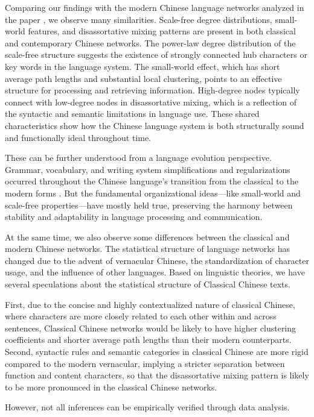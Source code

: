 \documentclass[11pt]{article}
\begin{document}
Comparing our findings with the modern Chinese language networks analyzed in the paper \cite{ZHOU20083039}, we observe many similarities.  Scale-free degree distributions, small-world features, and disassortative mixing patterns are present in both classical and contemporary Chinese networks. The power-law degree distribution of the scale-free structure suggests the existence of strongly connected hub characters or key words in the language system. The small-world effect, which has short average path lengths and substantial local clustering, points to an effective structure for processing and retrieving information. High-degree nodes typically connect with low-degree nodes in disassortative mixing, which is a reflection of the syntactic and semantic limitations in language use. These shared characteristics show how the Chinese language system is both structurally sound and functionally ideal throughout time.

These can be further understood from a language evolution perspective. Grammar, vocabulary, and writing system simplifications and regularizations occurred throughout the Chinese language's transition from the classical to the modern forms \cite{chen1999modern}. But the fundamental organizational ideas—like small-world and scale-free properties—have mostly held true, preserving the harmony between stability and adaptability in language processing and communication.

At the same time, we also observe some differences between the classical and modern Chinese networks. The statistical structure of language networks has changed due to the advent of vernacular Chinese, the standardization of character usage, and the influence of other languages. Based on linguistic theories, we have several speculations about the statistical structure of Classical Chinese texts.

First, due to the concise and highly contextualized nature of classical Chinese, where characters are more closely related to each other within and across sentences, Classical Chinese networks would be likely to have higher clustering coefficients and shorter average path lengths than their modern counterparts. Second, syntactic rules and semantic categories in classical Chinese are more rigid compared to the modern vernacular,  implying a stricter separation between function and content characters, so that the disassortative mixing pattern is likely to be more pronounced in the classical Chinese networks. 

However, not all inferences can be empirically verified through data analysis.
\end{document}
